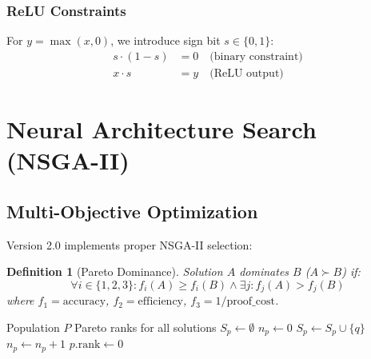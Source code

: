 \documentclass[11pt,a4paper]{article}
\newtheorem{definition}[theorem]{Definition}
\begin{document}
\subsubsection{ReLU Constraints}

For $y = \max(x, 0)$, we introduce sign bit $s \in \{0, 1\}$:
\begin{align}
s \cdot (1 - s) &= 0 \quad \text{(binary constraint)} \\
x \cdot s &= y \quad \text{(ReLU output)}
\end{align}

\section{Neural Architecture Search (NSGA-II)}

\subsection{Multi-Objective Optimization}

Version 2.0 implements proper NSGA-II selection:

\begin{definition}[Pareto Dominance]
Solution $A$ dominates $B$ ($A \succ B$) if:
\begin{equation}
\forall i \in \{1,2,3\}: f_i(A) \geq f_i(B) \land \exists j: f_j(A) > f_j(B)
\end{equation}
where $f_1 = \text{accuracy}$, $f_2 = \text{efficiency}$, $f_3 = 1/\text{proof\_cost}$.
\end{definition}

\begin{algorithm}
\caption{Fast Non-Dominated Sort (NSGA-II)}
\begin{algorithmic}[1]
\Require Population $P$
\Ensure Pareto ranks for all solutions
    \State $S_p \gets \emptyset$ 
    \State $n_p \gets 0$ 
            \State $S_p \gets S_p \cup \{q\}$
            \State $n_p \gets n_p + 1$
        \EndIf
    \EndFor
        \State $p.\text{rank} \gets 0$ 
    \EndIf
\EndFor
\State {}
\end{algorithmic}
\end{algorithm}
\end{document}
